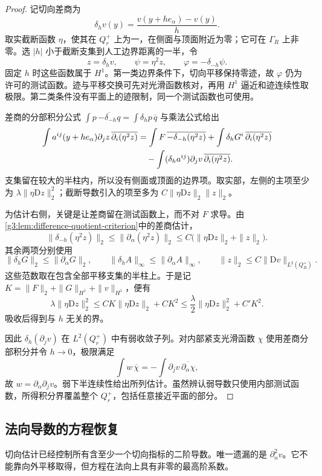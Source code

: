 \begin{proof}
	记切向差商为
	\[
	\delta_h v(y)=\frac{v(y+he_\alpha)-v(y)}h.
	\]
	取实截断函数 \(\eta\)，使其在 \(Q_r^+\) 上为一，在侧面与顶面附近为零；它可在 \(\Gamma_R\) 上非零。选 \(|h|\) 小于截断支集到人工边界距离的一半，令
	\[
	z=\delta_hv,\qquad \psi=\eta^2z,\qquad
	\varphi=-\delta_{-h}\psi.
	\]
	固定 \(h\) 时这些函数属于 \(H^1\)。第一类边界条件下，切向平移保持零迹，故 \(\varphi\) 仍为许可的测试函数。迹与平移交换可先对光滑函数核对，再用 \(H^1\) 逼近和迹连续性取极限。第二类条件没有平面上的迹限制，同一个测试函数也可使用。

	差商的分部积分公式
	\(\int p\,\overline{-\delta_{-h}q}=\int\delta_hp\,\overline q\)
	与乘法公式给出
	\begin{align}
	\int a^{ij}(y+he_\alpha)\partial_jz\,
																	\overline{\partial_i(\eta^2z)}
	&=\int F\,\overline{-\delta_{-h}(\eta^2z)}
			+\int\delta_hG^i\,\overline{\partial_i(\eta^2z)}
	\notag\\
	&\quad-\int(\delta_ha^{ij})\partial_jv\,
																				\overline{\partial_i(\eta^2z)}.
	\label{g3:eq:boundary-tangential-energy}
	\end{align}
	支集留在较大的半柱内，所以没有侧面或顶面的边界项。取实部，左侧的主项至少为
	\(\lambda\|\eta\mathrm Dz\|_2^2\)；截断导数引入的项至多为
	\(C\|\eta\mathrm Dz\|_2\|z\|_2\)。

	为估计右侧，关键是让差商留在测试函数上，而不对 \(F\) 求导。由\cref{g3:lem:difference-quotient-criterion}中的差商估计，
	\[
	\|\delta_{-h}(\eta^2z)\|_2
	\le\|\partial_\alpha(\eta^2z)\|_2
	\le C\bigl(\|\eta\mathrm Dz\|_2+\|z\|_2\bigr).
	\]
	其余两项分别使用
	\[
	\|\delta_hG\|_2\le\|\partial_\alpha G\|_2,\qquad
	\|\delta_hA\|_\infty\le\|\partial_\alpha A\|_\infty,\qquad
	\|z\|_2\le C\|\mathrm Dv\|_{L^2(Q_R^+)}.
	\]
	这些范数取在包含全部平移支集的半柱上。于是记
	\(K=\|F\|_2+\|G\|_{H^1}+\|v\|_{H^1}\)，便有
	\[
	\lambda\|\eta\mathrm Dz\|_2^2
	\le CK\|\eta\mathrm Dz\|_2+CK^2
	\le \frac{\lambda}{2}\|\eta\mathrm Dz\|_2^2+C'K^2.
	\]
	吸收后得到与 \(h\) 无关的界。

	因此 \(\delta_h(\partial_jv)\) 在 \(L^2(Q_r^+)\) 中有弱收敛子列。对内部紧支光滑函数 \(\chi\) 使用差商分部积分并令 \(h\to0\)，极限满足
	\[
	\int w\,\overline\chi=-\int\partial_jv\,\overline{\partial_\alpha\chi},
	\]
	故 \(w=\partial_\alpha\partial_jv\)。弱下半连续性给出所列估计。虽然辨认弱导数只使用内部测试函数，所得积分界覆盖整个 \(Q_r^+\)，包括任意接近平面的部分。
\end{proof}

\subsection{法向导数的方程恢复}
\label{g3:subsec:1402:02}
切向估计已经控制所有含至少一个切向指标的二阶导数。唯一遗漏的是 \(\partial_n^2v\)。它不能靠向外平移取得，但方程在法向上具有非零的最高阶系数。

